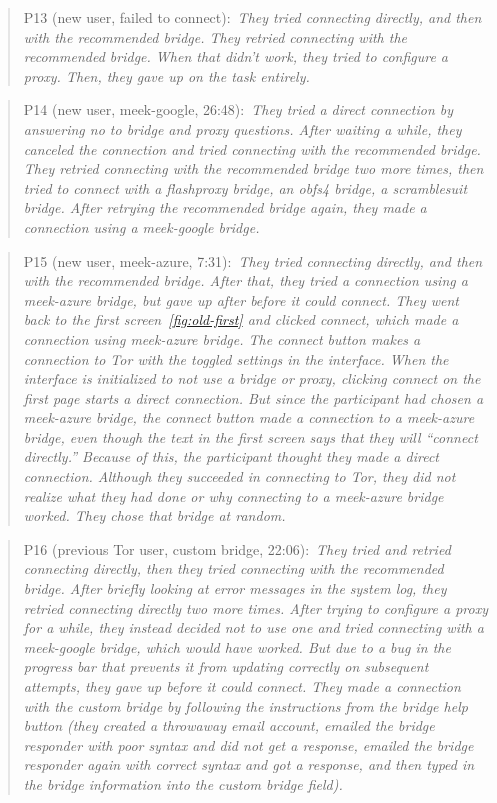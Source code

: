 \documentclass[USenglish,oneside,twocolumn]{article}
\newcommand{\pquote}[2]{
\begin{quotation}
\noindent #1:~\textit{#2}
\end{quotation}
}
\begin{document}
\pquote{P13 (new user, failed to connect)}{They tried connecting directly, and then with the recommended bridge. They retried connecting with the recommended bridge. When that didn't work, they tried to configure a proxy. Then, they gave up on the task entirely.}

\pquote{P14 (new user, meek-google, 26:48)}{They tried a direct connection by answering no to bridge and proxy questions. After waiting a while, they canceled the connection and tried connecting with the recommended bridge. They retried connecting with the recommended bridge two more times, then tried to connect with a flashproxy bridge, an obfs4 bridge, a scramblesuit bridge. After retrying the recommended bridge again, they made a connection using a meek-google bridge.}

\pquote{P15 (new user, meek-azure, 7:31)}{They tried connecting directly, and then with the recommended bridge. After that, they tried a connection using a meek-azure bridge, but gave up after before it could connect. They went back to the first screen~\ref{fig:old-first} and clicked connect, which made a connection using meek-azure bridge. The connect button makes a connection to Tor with the toggled settings in the interface. When the interface is initialized to not use a bridge or proxy, clicking connect on the first page starts a direct connection. But since the participant had chosen a meek-azure bridge, the connect button made a connection to a meek-azure bridge, even though the text in the first screen says that they will ``connect directly.'' Because of this, the participant thought they made a direct connection. Although they succeeded in connecting to Tor, they did not realize what they had done or why connecting to a meek-azure bridge worked. They chose that bridge at random.}

\pquote{P16 (previous Tor user, custom bridge, 22:06)}{They tried and retried connecting directly, then they tried connecting with the recommended bridge. After briefly looking at error messages in the system log, they retried connecting directly two more times. After trying to configure a proxy for a while, they instead decided not to use one and tried connecting with a meek-google bridge, which would have worked. But  due to a bug in the progress bar that prevents it from updating correctly on subsequent attempts, they gave up before it could connect. They made a connection with the custom bridge by following the instructions from the bridge help button (they created a throwaway email account, emailed the bridge responder with poor syntax and did not get a response, emailed the bridge responder again with correct syntax and got a response, and then typed in the bridge information into the custom bridge field).}
\end{document}
